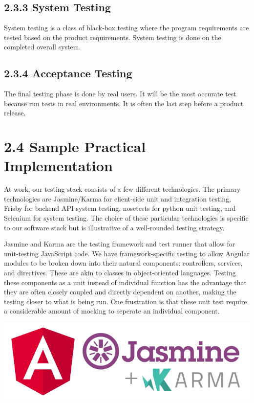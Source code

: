 \documentclass[12pt]{report}
\begin{document}
\subsection*{2.3.3 System Testing}
\par\noindent
System testing is a class of black-box testing where the program requirements are tested based on the product requirements. System testing is done on the completed overall system.

\subsection*{2.3.4 Acceptance Testing}
\par\noindent
The final testing phase is done by real users. It will be the most accurate test because run tests in real environments. It is often the last step before a product release.


\section*{2.4 Sample Practical Implementation}
\par\noindent
At work, our testing stack consists of a few different technologies. The primary technologies are Jasmine/Karma for client-side unit and integration testing, Frisby for backend API system testing, nosetests for python unit testing, and Selenium for system testing. The choice of these particular technologies is specific to our software stack but is illustrative of a well-rounded testing strategy.

\par\noindent
Jasmine and Karma are the testing framework and test runner that allow for unit-testing JavaScript code. We have framework-specific testing to allow Angular modules to be broken down into their natural components: controllers, services, and directives. These are akin to classes in object-oriented languages. Testing these components as a unit instead of individual function has the advantage that they are often closely coupled and directly dependent on another, making the testing closer to what is being run. One frustration is that these unit test require a considerable amount of mocking to seperate an individual component.

\begin{center}
\includegraphics[scale=0.4]{karma}
\end{center}
\end{document}

